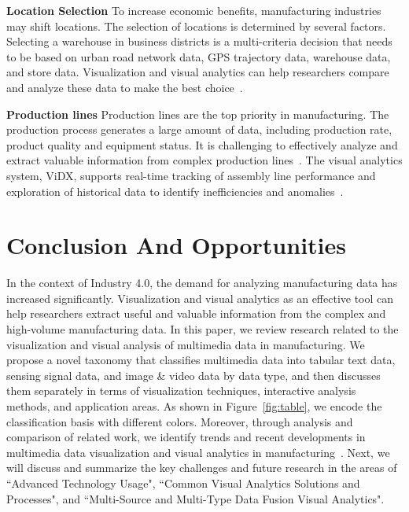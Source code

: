 \documentclass[a4paper,fleqn]{cas-dc}
\begin{document}
\textbf{Location Selection} To increase economic benefits, manufacturing industries may shift locations. The selection of locations is determined by several factors. Selecting a warehouse in business districts is a multi-criteria decision that needs to be based on urban road network data, GPS
trajectory data, warehouse data, and store data. Visualization and visual analytics can help researchers compare and analyze these data to make the best choice~\cite{Li2020}.

\textbf{Production lines} Production lines are the top priority in manufacturing. The production process generates a large amount of data, including production rate, product quality and equipment status. It is challenging to effectively analyze and extract valuable information from complex production lines~\cite{wu2018visual}. The visual analytics system, ViDX, supports real-time tracking of assembly line performance and exploration of historical data to identify inefficiencies and anomalies~\cite{xu2016vidx}.

\section{Conclusion And Opportunities}
In the context of Industry 4.0, the demand for analyzing manufacturing data has increased significantly. Visualization and visual analytics as an effective tool can help researchers extract useful and valuable information from the complex and high-volume manufacturing data. 
In this paper, we review research related to the visualization and visual analysis of multimedia data in manufacturing.
We propose a novel taxonomy that classifies multimedia data into tabular text data, sensing signal data, and image \& video data by data type, and then discusses them separately in terms of visualization techniques, interactive analysis methods, and application areas. As shown in Figure~\ref{fig:table}, we encode the classification basis with different colors.
Moreover, through analysis and comparison of related work, we identify trends and recent developments in multimedia data visualization and visual analytics in manufacturing~\cite{Gehlot2022}.
Next, we will discuss and summarize the key challenges and future research in the areas of ``Advanced Technology Usage", ``Common Visual Analytics Solutions and Processes", and ``Multi-Source and Multi-Type Data Fusion Visual Analytics".
\end{document}

